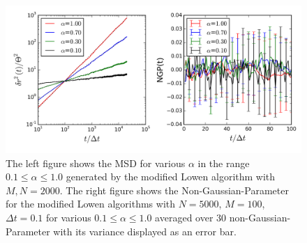 \documentclass[
  a4paper,BCOR10mm,twoside,
  headsepline,footsepline,%
  fleqn,openbib
]{scrbook}
\begin{document}
\begin{figure}[h]
\centering
\includegraphics[width=\textwidth]{./data/nongaussianlowenalphaneumodifed.png}
\caption{The left figure shows the MSD for various $\alpha$ in the range $0.1\leq\alpha\leq1.0$ generated by the modified Lowen algorithm with $M,N=2000$.\newline
The right figure shows the  Non-Gaussian-Parameter for the modified Lowen algorithms with  $N=5000$, $M=100$, $\Delta t = 0.1$ for various $0.1\leq\alpha\leq1.0$ averaged over $30$ non-Gaussian-Parameter with its variance displayed as an error bar.}
\label{nongaussianlowenmodif}
\end{figure}
\end{document}
